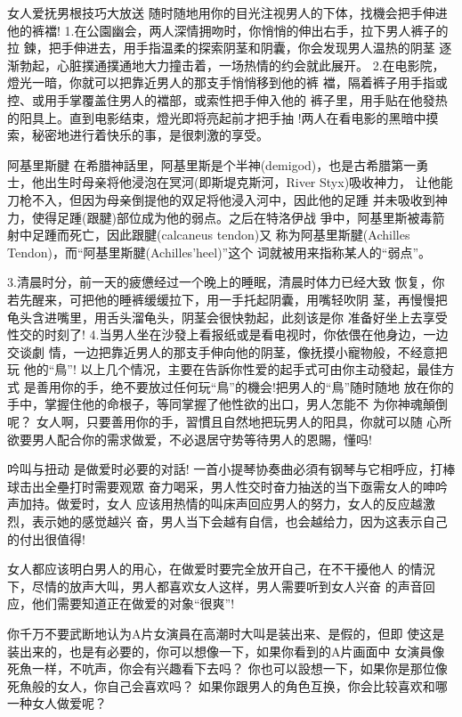 \documentclass[12pt,UTF8]{ctexbook}
\begin{document}
女人爱抚男根技巧大放送
随时随地用你的目光注视男人的下体，找機会把手伸进他的裤襠!
1.在公園幽会，两人深情拥吻时，你悄悄的伸出右手，拉下男人裤子的拉
鍊，把手伸进去，用手指温柔的探索阴茎和阴囊，你会发现男人温热的阴茎
逐渐勃起，心脏撲通撲通地大力撞击着，一场热情的约会就此展开。
2.在电影院，燈光一暗，你就可以把靠近男人的那支手悄悄移到他的裤
襠，隔着裤子用手指或控、或用手掌覆盖住男人的襠部，或索性把手伸入他的
裤子里，用手贴在他發热的阳具上。直到电影结束，燈光即将亮起前才把手抽
!两人在看电影的黑暗中摸索，秘密地进行着快乐的事，是很刺激的享受。

阿基里斯腱
在希腊神話里，阿基里斯是个半神(demigod)，也是古希腊第一勇
士，他出生时母亲将他浸泡在冥河(即斯堤克斯河，River Styx)吸收神力，
让他能刀枪不入，但因为母亲倒提他的双足将他浸入河中，因此他的足踵
并未吸收到神力，使得足踵(跟腱)部位成为他的弱点。之后在特洛伊战
爭中，阿基里斯被毒箭射中足踵而死亡，因此跟腱(calcaneus tendon)又
称为阿基里斯腱(Achilles Tendon)，而“阿基里斯腱(Achilles'heel)”这个
词就被用来指称某人的“弱点”。

3.清晨时分，前一天的疲憊经过一个晚上的睡眠，清晨时体力已经大致
恢复，你若先醒来，可把他的睡裤缓缓拉下，用一手托起阴囊，用嘴轻吹阴
茎，再慢慢把龟头含进嘴里，用舌头溜龟头，阴茎会很快勃起，此刻该是你
准备好坐上去享受性交的时刻了!
4.当男人坐在沙發上看报纸或是看电视时，你依偎在他身边，一边交谈劇
情，一边把靠近男人的那支手伸向他的阴茎，像抚摸小寵物般，不经意把玩
他的“鳥”!
以上几个情况，主要在告訴你性爱的起手式可由你主动發起，最佳方式
是善用你的手，绝不要放过任何玩“鳥”的機会!把男人的“鳥”随时随地
放在你的手中，掌握住他的命根子，等同掌握了他性欲的出口，男人怎能不
为你神魂顛倒呢？
女人啊，只要善用你的手，習慣且自然地把玩男人的阳具，你就可以随
心所欲要男人配合你的需求做爱，不必退居守势等待男人的恩賜，懂吗!

吟叫与扭动
是做爱时必要的对話!
一首小提琴协奏曲必須有钢琴与它相呼应，打棒球击出全壘打时需要观眾
奋力喝采，男人性交时奋力抽送的当下亟需女人的呻吟声加持。做爱时，女人
应该用热情的叫床声回应男人的努力，女人的反应越激烈，表示她的感觉越兴
奋，男人当下会越有自信，也会越给力，因为这表示自己的付出很值得!

女人都应该明白男人的用心，在做爱时要完全放开自己，在不干擾他人
的情況下，尽情的放声大叫，男人都喜欢女人这样，男人需要听到女人兴奋
的声音回应，他们需要知道正在做爱的对象“很爽”!

你千万不要武断地认为A片女演員在高潮时大叫是装出来、是假的，但即
使这是装出来的，也是有必要的，你可以想像一下，如果你看到的A片画面中
女演員像死魚一样，不吭声，你会有兴趣看下去吗？
你也可以設想一下，如果你是那位像死魚般的女人，你自己会喜欢吗？
如果你跟男人的角色互换，你会比较喜欢和哪一种女人做爱呢？
\end{document}
